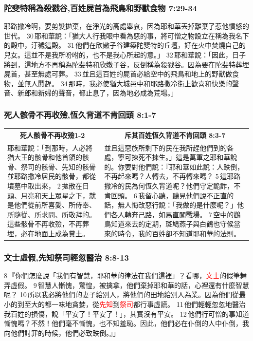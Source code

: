 \subsubsection{陀斐特稱為殺戮谷,百姓屍首為飛鳥和野獸食物 7:29-34}
耶路撒冷啊，要剪髮拋棄，在淨光的高處舉哀，因為耶和華丟掉離棄了惹他憤怒的世代。 30 耶和華說：「猶大人行我眼中看為惡的事，將可憎之物設立在稱為我名下的殿中，汙穢這殿。 31 他們在欣嫩子谷建築陀斐特的丘壇，好在火中焚燒自己的兒女。這並不是我所吩咐的，也不是我心所起的意。」 32 耶和華說：「因此，日子將到，這地方不再稱為陀斐特和欣嫩子谷，反倒稱為殺戮谷。因為要在陀斐特葬埋屍首，甚至無處可葬。 33 並且這百姓的屍首必給空中的飛鳥和地上的野獸做食物，並無人鬨趕。 34 那時，我必使猶大城邑中和耶路撒冷街上歡喜和快樂的聲音、新郎和新婦的聲音，都止息了，因為地必成為荒場。」



\subsubsection{死人骸骨不再收殮,恆久背道不肯回頭 8:1-7}
\begin{table}[H]
\centering
\begin{tabular}{p{6.75cm}|p{10.50cm}}\hline\hline
\multicolumn{1}{c|}{死人骸骨不再收殮1-2}&\multicolumn{1}{c}{斥其百姓恆久背道不肯回頭 8:3-7}\\\hline
耶和華說：「到那時，人必將猶大王的骸骨和他首領的骸骨、祭司的骸骨、先知的骸骨並耶路撒冷居民的骸骨，都從墳墓中取出來， 2 拋散在日頭、月亮和天上眾星之下，就是他們從前所喜愛、所侍奉、所隨從、所求問、所敬拜的。這些骸骨不再收殮，不再葬埋，必在地面上成為糞土。 
&並且這惡族所剩下的民在我所趕他們到的各處，寧可揀死不揀生。」這是萬軍之耶和華說的。你要對他們說：『耶和華如此說：人跌倒，不再起來嗎？人轉去，不再轉來嗎？ 5 這耶路撒冷的民為何恆久背道呢？他們守定詭詐，不肯回頭。 6 我留心聽，聽見他們說不正直的話，無人悔改惡行說：「我做的是什麼呢？」他們各人轉奔己路，如馬直闖戰場。 7 空中的鸛鳥知道來去的定期，斑鳩燕子與白鶴也守候當來的時令，我的百姓卻不知道耶和華的法則。\\\hline
\end{tabular}
\end{table}


\subsubsection{文士虛假,先知祭司輕忽醫治 8:8-13}
8 『你們怎麼說「我們有智慧，耶和華的律法在我們這裡」？看哪，\textcolor{red}{文士}的假筆舞弄虛假。 9 智慧人慚愧，驚惶，被擒拿，他們棄掉耶和華的話，心裡還有什麼智慧呢？ 10 所以我必將他們的妻子給別人，將他們的田地給別人為業。因為他們從最小的到至大的都一味地貪婪，從\textcolor{red}{先知}到\textcolor{red}{祭司}都行事虛謊。 11 他們輕輕忽忽地醫治我百姓的損傷，說「平安了！平安了！」，其實沒有平安。 12 他們行可憎的事知道慚愧嗎？不然！他們毫不慚愧，也不知羞恥。因此，他們必在仆倒的人中仆倒，我向他們討罪的時候，他們必致跌倒。』」

